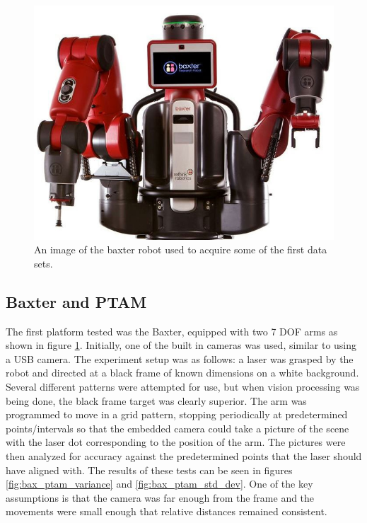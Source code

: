 \documentclass[12pt]{report}
\begin{document}
\begin{figure}[!ht]
	\centering
	\includegraphics[scale=0.55]{bax_image.jpg}
	\caption{An image of the baxter robot used to acquire some of the first data sets.}
	\label{fig:baxter_image}
\end{figure}

\subsection{Baxter and PTAM}
The first platform tested was the Baxter, equipped with two 7 DOF arms as shown in figure \ref{fig:baxter_image}. Initially, one of the built in cameras was used, similar to using a USB camera. The experiment setup was as follows: a laser was grasped by the robot and directed at a black frame of known dimensions on a white background. Several different patterns were attempted for use, but when vision processing was being done, the black frame target was clearly superior. The arm was programmed to move in a grid pattern, stopping periodically at predetermined points/intervals so that the embedded camera could take a picture of the scene with the laser dot corresponding to the position of the arm. The pictures were then analyzed for accuracy against the predetermined points that the laser should have aligned with. The results of these tests can be seen in figures \ref{fig:bax_ptam_variance} and \ref{fig:bax_ptam_std_dev}. One of the key assumptions is that the camera was far enough from the frame and the movements were small enough that relative distances remained consistent.
\end{document}
